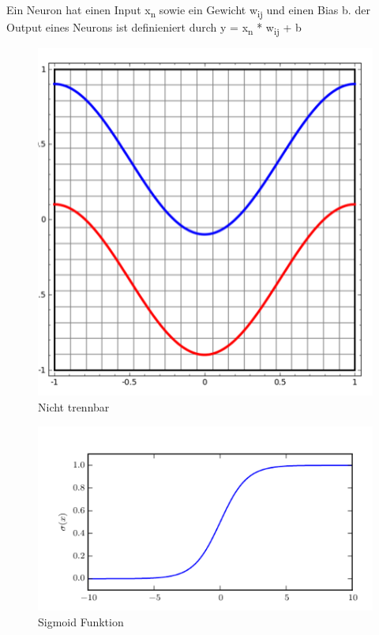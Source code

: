 \documentclass{llncs}
\begin{document}
Ein Neuron hat einen Input x\textsubscript{n} sowie ein Gewicht w\textsubscript{ij} und einen Bias b. der Output eines Neurons ist definieniert durch y = x\textsubscript{n} * w\textsubscript{ij} + b

\begin{figure}[htbp] 
	\centering
	\includegraphics[width=1.0\textwidth]{lineartrennbar.png}
	\caption{Nicht trennbar}
	\label{fig:Bild1}
\end{figure}

\begin{figure}[htbp] 
	\centering
	\includegraphics[width=1.0\textwidth]{sigmoid.png}
	\caption{Sigmoid Funktion}
	\label{fig:Bild1}
\end{figure}
\end{document}

